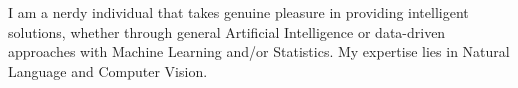 

\begin{cvparagraph}


\begin{justify}

I am a nerdy individual that takes genuine pleasure in providing intelligent
solutions, whether through general Artificial Intelligence or data-driven
approaches with Machine Learning and/or Statistics. My expertise lies in
Natural Language and Computer Vision.


\end{justify}


\end{cvparagraph}
